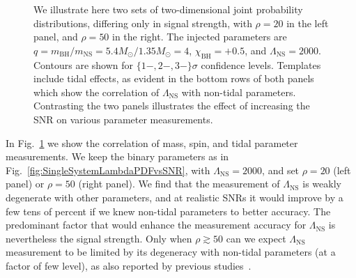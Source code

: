\documentclass[aps,prd,amsmath,floats,floatfix, twocolumn,
superscriptaddress,nofootinbib,showpacs]{revtex4-1}
\newcommand{\lambdans}{\Lambda_\mathrm{NS}}
\newcommand{\chibh}{\chi_\mathrm{BH}}
\newcommand{\mbh}{m_\mathrm{BH}}
\newcommand{\mns}{m_\mathrm{NS}}
\begin{document}
\begin{appendix}
\begin{figure}
{%
We illustrate here two sets of two-dimensional joint probability distributions,
differing only in signal strength, with $\rho=20$ in the left panel, and
$\rho=50$ in the right. The injected parameters are 
$q = \mbh/\mns = 5.4M_\odot/1.35M_\odot = 4$, $\chibh=+0.5$, and 
$\lambdans=2000$. Contours are shown for $\{1-,2-,3-\}\sigma$ confidence levels.
Templates include tidal effects, as evident in the bottom rows
of both panels which show the correlation of $\lambdans$ with non-tidal 
parameters. Contrasting the two panels illustrates the effect of increasing the
SNR on various parameter measurements.
}
\label{fig:SingleSystemLambda2DPDFs}
\end{figure}







In Fig.~\ref{fig:SingleSystemLambda2DPDFs} we show the correlation of
mass, spin, and tidal parameter measurements. We keep the binary parameters
as in Fig.~\ref{fig:SingleSystemLambdaPDFvsSNR}, with $\lambdans=2000$, and
set $\rho=20$ (left panel) or $\rho=50$ (right panel).
%
We find that the measurement of $\lambdans$ is weakly degenerate with
other parameters, and at realistic SNRs it would improve by a few tens of 
percent if we knew non-tidal parameters to better accuracy. The predominant
factor that would enhance the measurement accuracy for $\lambdans$ is 
nevertheless the signal strength. Only when $\rho\gtrsim 50$ can we
expect $\lambdans$ measurement to be limited by its degeneracy with 
non-tidal parameters (at a factor of few level), as also reported by previous
studies~\cite{Lackey:2013axa}.








\end{appendix}
\end{document}
